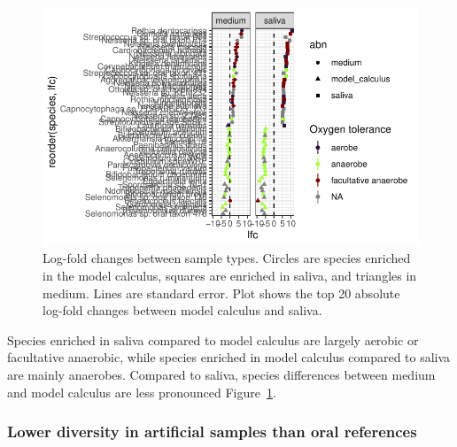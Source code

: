 \documentclass[
]{article}
\begin{document}
\begin{figure}

{\centering \includegraphics{figures/fig-diffabund-byoc-1.pdf}

}

\caption{\label{fig-diffabund-byoc}Log-fold changes between sample
types. Circles are species enriched in the model calculus, squares are
enriched in saliva, and triangles in medium. Lines are standard error.
Plot shows the top 20 absolute log-fold changes between model calculus
and saliva.}

\end{figure}

Species enriched in saliva compared to model calculus are largely
aerobic or facultative anaerobic, while species enriched in model
calculus compared to saliva are mainly anaerobes. Compared to saliva,
species differences between medium and model calculus are less
pronounced Figure~\ref{fig-diffabund-byoc}.

\hypertarget{lower-diversity-in-artificial-samples-than-oral-references}{%
\subsubsection{Lower diversity in artificial samples than oral
references}\label{lower-diversity-in-artificial-samples-than-oral-references}}
\end{document}
